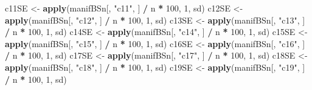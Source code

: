 \documentclass[
]{book}
\newenvironment{Shaded}{\begin{snugshade}}{\end{snugshade}}
\newcommand{\DecValTok}[1]{\textcolor[rgb]{0.00,0.00,0.81}{#1}}
\newcommand{\FunctionTok}[1]{\textcolor[rgb]{0.13,0.29,0.53}{\textbf{#1}}}
\newcommand{\NormalTok}[1]{#1}
\newcommand{\OtherTok}[1]{\textcolor[rgb]{0.56,0.35,0.01}{#1}}
\newcommand{\SpecialCharTok}[1]{\textcolor[rgb]{0.81,0.36,0.00}{\textbf{#1}}}
\newcommand{\StringTok}[1]{\textcolor[rgb]{0.31,0.60,0.02}{#1}}
\begin{document}
\begin{Shaded}
\begin{Highlighting}[]
\NormalTok{c11SE }\OtherTok{\textless{}{-}} \FunctionTok{apply}\NormalTok{(manifBSn[, }\StringTok{"c11"}\NormalTok{, ] }\SpecialCharTok{/}\NormalTok{ n }\SpecialCharTok{*} \DecValTok{100}\NormalTok{, }\DecValTok{1}\NormalTok{, sd)}
\NormalTok{c12SE }\OtherTok{\textless{}{-}} \FunctionTok{apply}\NormalTok{(manifBSn[, }\StringTok{"c12"}\NormalTok{, ] }\SpecialCharTok{/}\NormalTok{ n }\SpecialCharTok{*} \DecValTok{100}\NormalTok{, }\DecValTok{1}\NormalTok{, sd)}
\NormalTok{c13SE }\OtherTok{\textless{}{-}} \FunctionTok{apply}\NormalTok{(manifBSn[, }\StringTok{"c13"}\NormalTok{, ] }\SpecialCharTok{/}\NormalTok{ n }\SpecialCharTok{*} \DecValTok{100}\NormalTok{, }\DecValTok{1}\NormalTok{, sd)}
\NormalTok{c14SE }\OtherTok{\textless{}{-}} \FunctionTok{apply}\NormalTok{(manifBSn[, }\StringTok{"c14"}\NormalTok{, ] }\SpecialCharTok{/}\NormalTok{ n }\SpecialCharTok{*} \DecValTok{100}\NormalTok{, }\DecValTok{1}\NormalTok{, sd)}
\NormalTok{c15SE }\OtherTok{\textless{}{-}} \FunctionTok{apply}\NormalTok{(manifBSn[, }\StringTok{"c15"}\NormalTok{, ] }\SpecialCharTok{/}\NormalTok{ n }\SpecialCharTok{*} \DecValTok{100}\NormalTok{, }\DecValTok{1}\NormalTok{, sd)}
\NormalTok{c16SE }\OtherTok{\textless{}{-}} \FunctionTok{apply}\NormalTok{(manifBSn[, }\StringTok{"c16"}\NormalTok{, ] }\SpecialCharTok{/}\NormalTok{ n }\SpecialCharTok{*} \DecValTok{100}\NormalTok{, }\DecValTok{1}\NormalTok{, sd)}
\NormalTok{c17SE }\OtherTok{\textless{}{-}} \FunctionTok{apply}\NormalTok{(manifBSn[, }\StringTok{"c17"}\NormalTok{, ] }\SpecialCharTok{/}\NormalTok{ n }\SpecialCharTok{*} \DecValTok{100}\NormalTok{, }\DecValTok{1}\NormalTok{, sd)}
\NormalTok{c18SE }\OtherTok{\textless{}{-}} \FunctionTok{apply}\NormalTok{(manifBSn[, }\StringTok{"c18"}\NormalTok{, ] }\SpecialCharTok{/}\NormalTok{ n }\SpecialCharTok{*} \DecValTok{100}\NormalTok{, }\DecValTok{1}\NormalTok{, sd)}
\NormalTok{c19SE }\OtherTok{\textless{}{-}} \FunctionTok{apply}\NormalTok{(manifBSn[, }\StringTok{"c19"}\NormalTok{, ] }\SpecialCharTok{/}\NormalTok{ n }\SpecialCharTok{*} \DecValTok{100}\NormalTok{, }\DecValTok{1}\NormalTok{, sd)}


\end{Highlighting}
\end{Shaded}
\end{document}
